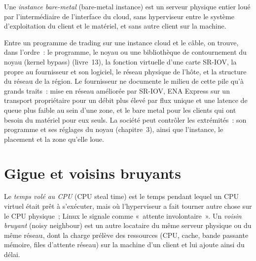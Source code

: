 \begin{definition}\label{def:nw:trading-in-a-public-cloud:bare}
Une \emph{instance bare-metal} (bare-metal instance) est un serveur physique entier loué par l'intermédiaire de l'interface du cloud, sans hyperviseur
entre le système d'exploitation du client et le matériel, et sans autre client sur la machine.
\end{definition}

Entre un programme de trading sur une instance cloud et le câble, on trouve, dans l'ordre~: le programme, le noyau ou une bibliothèque de contournement du noyau (kernel bypass) (livre~13),
la fonction virtuelle d'une carte SR-IOV, la  propre au fournisseur et son logiciel, le réseau physique de l'hôte, et la
structure du réseau de la région. Le fournisseur ne documente le milieu de cette pile qu'à grands traits~: mise en réseau améliorée par SR-IOV, ENA Express sur un
transport propriétaire pour un débit plus élevé par flux unique et une latence de queue plus faible au sein d'une zone, et le bare metal pour les clients qui ont besoin du matériel pour eux seuls.
La société peut contrôler les extrémités~: son programme et ses réglages du noyau (chapitre~3), ainsi que l'instance, le placement et la zone qu'elle loue.

\section{Gigue et voisins bruyants}

\begin{definition}\label{def:nw:trading-in-a-public-cloud:steal}
Le \emph{temps volé au CPU} (CPU steal time) est le temps pendant lequel un CPU virtuel était prêt à s'exécuter, mais où l'hyperviseur a fait tourner autre chose sur le CPU physique~; Linux
le signale comme «~attente involontaire~». Un \emph{voisin bruyant} (noisy neighbour) est un autre locataire du même serveur physique ou du même réseau, dont la charge
prélève des ressources (CPU, cache, bande passante mémoire, files d'attente réseau) sur la machine d'un client et lui ajoute ainsi du délai.
\end{definition}

